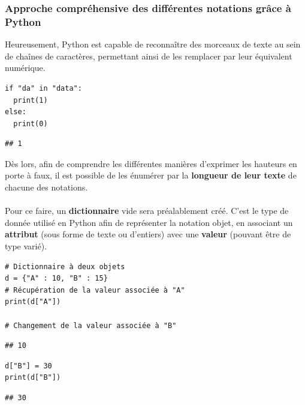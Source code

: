 \documentclass[
  11pt,
  french,
]{article}
\begin{document}
\newpage

\hypertarget{approche-compruxe9hensive-des-diffuxe9rentes-notations-gruxe2ce-uxe0-python}{%
\subsubsection{Approche compréhensive des différentes notations grâce à
Python}\label{approche-compruxe9hensive-des-diffuxe9rentes-notations-gruxe2ce-uxe0-python}}

Heureusement, Python est capable de reconnaître des morceaux de texte au
sein de chaînes de caractères, permettant ainsi de les remplacer par
leur équivalent numérique.

\begin{tcolorbox}[title= Exemple de détection de texte en Python ,colback=boitecode]
\begin{lstlisting}[style=code]
if "da" in "data":
  print(1)
else:
  print(0)\end{lstlisting}
\begin{lstlisting}[style=out]
## 1
\end{lstlisting}
\end{tcolorbox}

Dès lors, afin de comprendre les différentes manières d'exprimer les
hauteurs en porte à faux, il est possible de les énumérer par la
\textbf{longueur de leur texte} de chacune des notations.\\
~\\
Pour ce faire, un \textbf{dictionnaire} vide sera préalablement créé.
C'est le type de donnée utilisé en Python afin de représenter la
notation objet, en associant un \textbf{attribut} (sous forme de texte
ou d'entiers) avec une \textbf{valeur} (pouvant être de type varié).

\begin{tcolorbox}[title= Fondamentaux du dictionnaire en Python ,colback=boitecode]
\begin{lstlisting}[style=code]
# Dictionnaire à deux objets
d = {"A" : 10, "B" : 15}
# Récupération de la valeur associée à "A"
print(d["A"])

# Changement de la valeur associée à "B"\end{lstlisting}
\begin{lstlisting}[style=out]
## 10
\end{lstlisting}
\begin{lstlisting}[style=code]
d["B"] = 30
print(d["B"])\end{lstlisting}
\begin{lstlisting}[style=out]
## 30
\end{lstlisting}
\end{tcolorbox}
\end{document}
